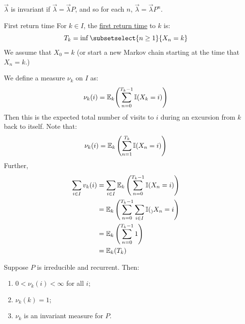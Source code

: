 \documentclass[../Main.tex]{subfiles}
\begin{document}
$\vec{\lambda}$ is invariant if $\vec{\lambda} = \vec{\lambda}P$, and so for each $n$, $\vec{\lambda} = \vec{\lambda} P^n$.
\begin{definition}{First return time}
    For $k \in I$, the \underline{first return time} to $k$ is:
    \begin{equation*}
        T_k = \inf\subsetselect{n \geq 1}{X_n = k}
    \end{equation*}
    We assume that $X_0 = k$ (or start a new Markov chain starting at the time that $X_n = k$.)
\end{definition}
We define a measure $\nu_k$ on $I$ as:
\begin{equation*}
    \nu_k(i) = \mathbb{E}_k{\left(\sum_{n=0}^{T_k - 1} \mathbb{I}(X_k = i)\right)}
\end{equation*}
Then this is the expected total number of visits to $i$ during an excursion from $k$ back to itself. Note that:
\begin{equation*}
    \nu_k(i) = \mathbb{E}_k\left(\sum_{n=1}^{T_k} \mathbb{I}(X_n = i)\right)
\end{equation*}
Further,
\begin{align*}
   \sum_{i \in I} v_k(i) &= \sum_{i \in I} \mathbb{E}_k\left(\sum_{n = 0}^{T_k-1} \mathbb{I}(X_n = i)\right) \\
    &= \mathbb{E}_k\left(\sum_{n = 0}^{T_k-1} \sum_{i \in I} \mathbb{I}(_){X_n = i}\right) \\
    &= \mathbb{E}_k\left(\sum_{n = 0}^{T_k-1} 1\right) \\
    &= \mathbb{E}_k(T_k)
\end{align*}
\begin{theorem}
    Suppose $P$ is irreducible and recurrent. Then:
    \begin{enumerate}
        \item $0 < \nu_k(i) < \infty$ for all $i$;
        \item $\nu_k(k) = 1$;
        \item $\nu_k$ is an invariant measure for $P$.
    \end{enumerate}
    \label{thmMeasureProps}
\end{theorem}
\end{document}
